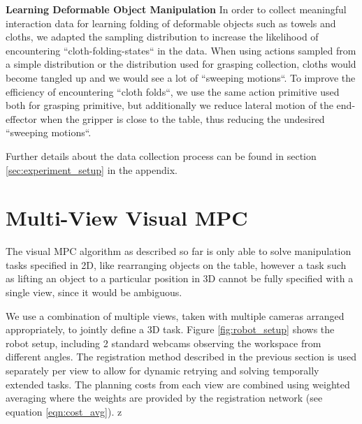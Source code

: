 \noindent \textbf{Learning Deformable Object Manipulation}
In order to collect meaningful interaction data for learning folding of deformable objects such as towels and cloths, we adapted the sampling distribution to increase the likelihood of encountering ``cloth-folding-states`` in the data. When using actions sampled from a simple distribution or the distribution used for grasping collection, cloths would become tangled up and we would see a lot of ``sweeping motions``. To improve the efficiency of encountering ``cloth folds``, we use the same action primitive used both for grasping primitive, but additionally we reduce lateral motion of the end-effector when the gripper is close to the table, thus reducing the undesired ``sweeping motions``.

Further details about the data collection process can be found in section \ref{sec:experiment_setup} in the appendix.

\section{Multi-View Visual MPC}
\label{sec:multiview}
The visual MPC algorithm as described so far is only able to solve manipulation tasks specified in 2D, like rearranging objects on the table, however a task such as lifting an object to a particular position in 3D cannot be fully specified with a single view, since it would be ambiguous. 

We use a combination of multiple views, taken with multiple cameras arranged appropriately, to jointly define a 3D task. Figure \ref{fig:robot_setup} shows the robot setup, including 2 standard webcams observing the workspace from different angles. The registration method described in the previous section is used separately per view to allow for dynamic retrying and solving temporally extended tasks. The planning costs from each view are combined using weighted averaging where the weights are provided by the registration network (see equation \ref{eqn:cost_avg}).  z	





